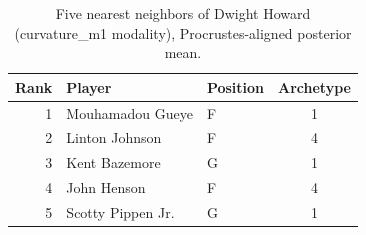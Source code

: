 \begin{table}[htbp]
  \centering\small
  \begin{tabular}{rllc}
    \toprule
    Rank & Player & Position & Archetype \\
    \midrule
    1 & Mouhamadou Gueye & F & 1 \\
    2 & Linton Johnson & F & 4 \\
    3 & Kent Bazemore & G & 1 \\
    4 & John Henson & F & 4 \\
    5 & Scotty Pippen Jr. & G & 1 \\
    \bottomrule
  \end{tabular}
  \caption{Five nearest neighbors of Dwight Howard (curvature_m1 modality), Procrustes-aligned posterior mean.}
  \label{tab:Dwight_Howard_neighbors_curvature_m1}
\end{table}

